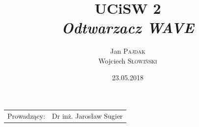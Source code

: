 \documentclass{article}
\title{UCiSW 2 \\ \textit{Odtwarzacz WAVE}} %
\author{Jan \textsc{Pajdak} \\ Wojciech \textsc{Słowiński}} %
\date{23.05.2018} %
\begin{document}
\maketitle %

\begin{center}
\begin{tabular}{l r}
Prowadzący: & Dr inż. Jarosław Sugier
\end{tabular}
\end{center}

\tableofcontents %







\end{document}
